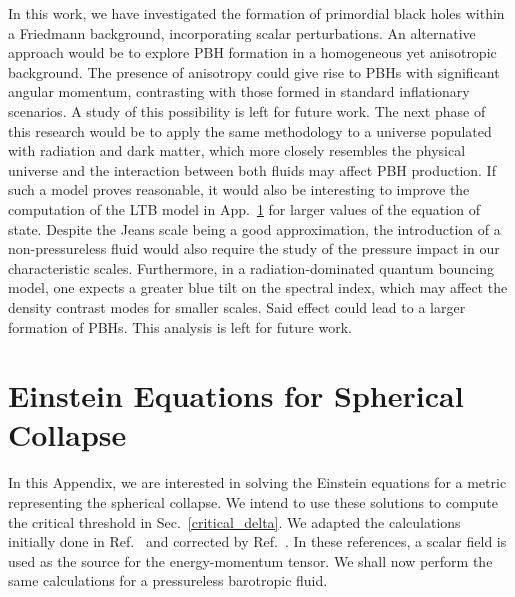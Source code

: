 \documentclass[a4paper,11pt]{article}
\begin{document}
In this work, we have investigated the formation of primordial black holes within a
Friedmann background, incorporating scalar perturbations. An alternative approach would
be to explore PBH formation in a homogeneous yet anisotropic background. The presence of
anisotropy could give rise to PBHs with significant angular momentum, contrasting with
those formed in standard inflationary scenarios. A study of this possibility is left for
future work. The next phase of this research would be to apply the same methodology to a
universe populated with radiation and dark matter, which more closely resembles the
physical universe and the interaction between both fluids may affect PBH production. If
such a model proves reasonable, it would also be interesting to improve the computation
of the LTB model in App.~\ref{appc} for larger values of the equation of state. Despite
the Jeans scale being a good approximation, the introduction of a non-pressureless fluid
would also require the study of the pressure impact in our characteristic scales.
Furthermore, in a radiation-dominated quantum bouncing model, one expects a greater blue
tilt on the spectral index, which may affect the density contrast modes for smaller
scales. Said effect could lead to a larger formation of PBHs. This analysis is left for
future work.




\appendix

\section{Einstein Equations for Spherical Collapse}
\label{appc}

In this Appendix, we are interested in solving the Einstein equations for a metric
representing the spherical collapse. We intend to use these solutions to compute the
critical threshold in Sec.~\ref{critical_delta}. We adapted the calculations initially
done in Ref.~\cite{Gonccalves2000} and corrected by Ref.~\cite{Martin2020}. In these
references, a scalar field is used as the source for the energy-momentum tensor. We
shall now perform the same calculations for a pressureless barotropic fluid.
\end{document}
